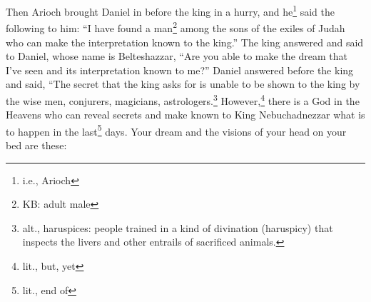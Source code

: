 \begin{inparaenum}
     Then Arioch brought Daniel in before the king in a hurry, and he\footnote{i.e., Arioch} said the following to him: ``I have found a man\footnote{KB: adult male} among the sons of the exiles of Judah who can make the interpretation known to the king.''%
     The king answered and said to Daniel, whose name is Belteshazzar, ``Are you able to make the dream that I've seen and its interpretation known to me?''%
     Daniel answered before the king and said, ``The secret that the king asks for is unable to be shown to the king by the wise men, conjurers, magicians, astrologers.\footnote{alt., haruspices: people trained in a kind of divination (haruspicy) that inspects the livers and other entrails of sacrificed animals.}%
     However,\footnote{lit., but, yet} there is a God in the Heavens who can reveal secrets and make known to King Nebuchadnezzar what is to happen in the last\footnote{lit., end of} days. Your dream and the visions of your head on your bed are these:%
    

\end{inparaenum}
